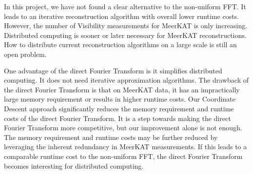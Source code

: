 In this project, we have not found a clear alternative to the non-uniform FFT. It leads to an iterative reconstruction algorithm with overall lower runtime costs. However, the number of Visibility measurements for MeerKAT is only increasing. Distributed computing is sooner or later necessary for MeerKAT reconstructions. How to distribute current reconstruction algorithms on a large scale is still an open problem.

One advantage of the direct Fourier Transform is it simplifies distributed computing. It does not need iterative approximation algorithms. The drawback of the direct Fourier Transform is that on MeerKAT data, it has an impractically large memory requirement or results in higher runtime costs. Our Coordinate Descent approach significantly reduces the memory requirement and runtime costs of the direct Fourier Transform. It is a step towards making the direct Fourier Transform more competitive, but our improvement alone is not enough. The memory requirement and runtime costs may be further reduced by leveraging the inherent redundancy in MeerKAT measurements. If this leads to a comparable runtime cost to the non-uniform FFT, the direct Fourier Transform becomes interesting for distributed computing.










